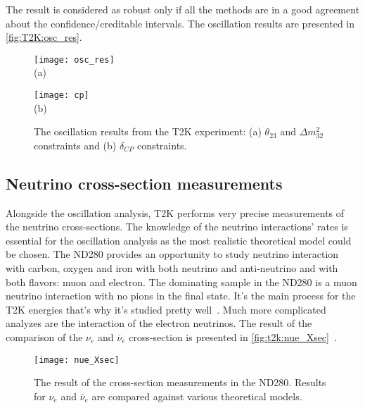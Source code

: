 \documentclass[../main.tex]{subfiles}
\begin{document}
The result is considered as robust only if all the methods are in a good agreement about the confidence/creditable intervals. The oscillation results are presented in \autoref{fig:T2K:osc_res}.

\begin{figure}[!ht]
  \centering
  \begin{minipage}{0.49\linewidth}
    \centering
    \texttt{[image: osc\_res]} \\ (a)
  \end{minipage}
  \begin{minipage}{0.49\linewidth}
    \centering
    \texttt{[image: cp]} \\ (b)
  \end{minipage}
    \caption{The oscillation results from the T2K experiment: (a) $\theta_{23}$ and $\Delta m_{32}^2$ constraints and (b) $\delta_{CP}$ constraints.}
    \label{fig:T2K:osc_res}
\end{figure}

\subsection{Neutrino cross-section measurements}
Alongside the oscillation analysis, T2K performs very precise measurements of the neutrino cross-sections. The knowledge of the neutrino interactions' rates is essential for the oscillation analysis as the most realistic theoretical model could be chosen. The ND280 provides an opportunity to study neutrino interaction with carbon, oxygen and iron with both neutrino and anti-neutrino and with both flavors: muon and electron. The dominating sample in the ND280 is a muon neutrino interaction with no pions in the final state. It's the main process for the T2K energies that's why it's studied pretty well~\cite{Abe2020a}. Much more complicated analyzes are the interaction of the electron neutrinos. The result of the comparison of the $\nu_e$ and $\overline{\nu}_e$ cross-section is presented in \autoref{fig:t2k:nue_Xsec}~\cite{Abe2020}.

\begin{figure}[!ht]
  \centering
  \texttt{[image: nue\_Xsec]}
  \caption{The result of the cross-section measurements in the ND280. Results for $\nu_e$ and $\overline{\nu}_e$ are compared against various theoretical models.}
  \label{fig:t2k:nue_Xsec}
\end{figure}
\end{document}
